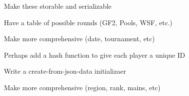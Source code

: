 
\begin{DoxyRefList}
\item[\label{todo__todo000002}%
\Hypertarget{todo__todo000002}%
File \hyperlink{match_8py}{match.py} ]
\begin{DoxyItemize}
\item Make these storable and serializable
\item Have a table of possible rounds (G\+F2, Pools, W\+SF, etc.)
\item Make more comprehensive (date, tournament, etc)  
\end{DoxyItemize}
\item[\label{todo__todo000003}%
\Hypertarget{todo__todo000003}%
File \hyperlink{player_8py}{player.py} ]
\begin{DoxyItemize}
\item Perhaps add a hash function to give each player a unique ID
\item Write a create-\/from-\/json-\/data initializaer
\item Make more comprehensive (region, rank, mains, etc) 
\end{DoxyItemize}
\end{DoxyRefList}